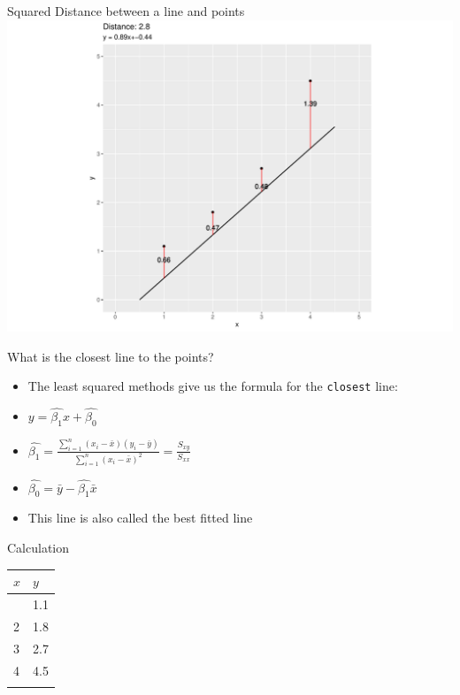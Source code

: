 \documentclass[
  ignorenonframetext,
]{beamer}
\begin{document}
\begin{frame}{Squared Distance between a line and points}
\protect\hypertarget{squared-distance-between-a-line-and-points-3}{}
\includegraphics{1_files/figure-beamer/unnamed-chunk-7-1.pdf}
\end{frame}

\begin{frame}[fragile]{What is the closest line to the points?}
\protect\hypertarget{what-is-the-closest-line-to-the-points}{}
\begin{itemize}
\item
  The least squared methods give us the formula for the \texttt{closest}
  line:
\item
  \(y = \hat{\beta_1}x+\hat{\beta_0}\)
\item
  \(\hat{\beta_{1}} = \frac{\sum_{i=1}^{n}{(x_i-\bar{x})(y_i-\bar{y})}}{\sum_{i=1}^{n}(x_i-\bar{x})^2} = \frac{S_{xy}}{S_{xx}}\)
\item
  \(\hat{\beta_{0}} = \bar{y} - \hat{\beta_{1}}\bar{x}\)
\item
  This line is also called the best fitted line
\end{itemize}
\end{frame}

\begin{frame}{Calculation}
\protect\hypertarget{calculation}{}
\begin{longtable}[]{@{}ll@{}}
\toprule\noalign{}
\(x\) & \(y\) \\
\midrule\noalign{}
\endhead
1 & 1.1 \\
2 & 1.8 \\
3 & 2.7 \\
4 & 4.5 \\
\bottomrule\noalign{}
\end{longtable}
\end{frame}
\end{document}
